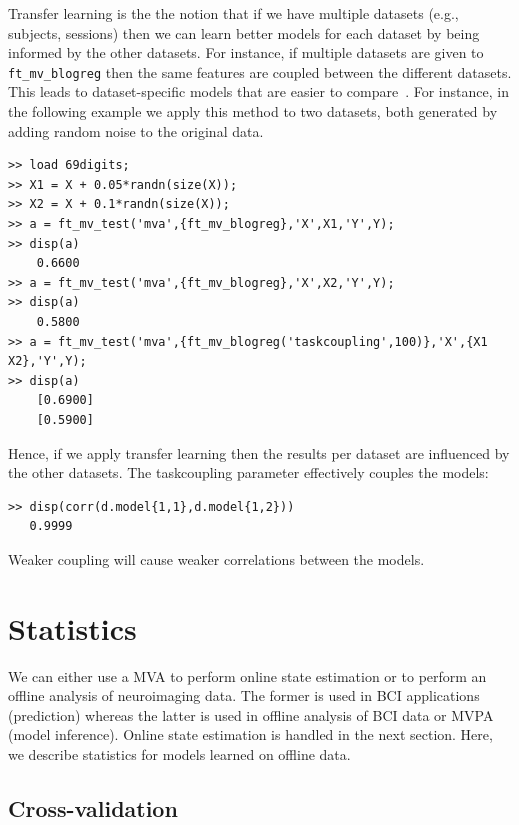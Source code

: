 \documentclass{article}
\renewcommand{\t}[1]{{\tt #1}}
\begin{document}
Transfer learning is the the notion that if we have multiple datasets (e.g., subjects, sessions) then we can learn better models for each dataset by being informed by the other datasets. For instance, if multiple datasets are given to \t{ft\_mv\_blogreg} then the same features are coupled between the different datasets. This leads to dataset-specific models that are easier to compare~\cite{gerven2010b}. For instance, in the following example we apply this method to two datasets, both generated by adding random noise to the original data.
\begin{verbatim}
>> load 69digits;
>> X1 = X + 0.05*randn(size(X));
>> X2 = X + 0.1*randn(size(X));
>> a = ft_mv_test('mva',{ft_mv_blogreg},'X',X1,'Y',Y);
>> disp(a)
    0.6600
>> a = ft_mv_test('mva',{ft_mv_blogreg},'X',X2,'Y',Y);
>> disp(a)
    0.5800
>> a = ft_mv_test('mva',{ft_mv_blogreg('taskcoupling',100)},'X',{X1 X2},'Y',Y);
>> disp(a)
    [0.6900]
    [0.5900]
\end{verbatim}
Hence, if we apply transfer learning then the results per dataset are influenced by the other datasets. The taskcoupling parameter effectively couples the models:
\begin{verbatim}
>> disp(corr(d.model{1,1},d.model{1,2}))
   0.9999
\end{verbatim}
Weaker coupling will cause weaker correlations between the models.
\section{Statistics}

We can either use a MVA to perform online state estimation or to perform an offline analysis of neuroimaging data. The former is used in BCI applications (prediction) whereas the latter is used in offline analysis of BCI data or MVPA (model inference). Online state estimation is handled in the next section. Here, we describe statistics for models learned on offline data.

\subsection{Cross-validation}
\end{document}
